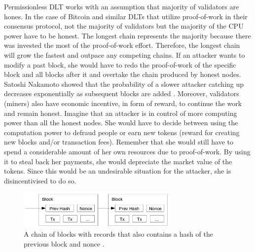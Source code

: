Permissionless DLT works with an assumption that majority of validators are hones. In the case of Bitcoin and similar DLTs that utilize proof-of-work in their consensus protocol, not the majority of validators but the majority of the CPU power have to be honest. The longest chain represents the majority because there was invested the most of the proof-of-work effort. Therefore, the longest chain will grow the fastest and outpace any competing chains. If an attacker wants to modify a past block, she would have to redo the proof-of-work of the specific block and all blocks after it and overtake the chain produced by honest nodes. Satoshi Nakamoto showed that the probability of a slower attacker catching up decreases exponentially as subsequent blocks are added \cite{nakamoto_bitcoin:_2008}. Moreover, validators (miners) also have economic incentive, in form of reward, to continue the work and remain honest. Imagine that an attacker is in control of more computing power than all the honest nodes. She would have to decide between using the computation power to defraud people or earn new tokens (reward for creating new blocks and/or transaction fees). Remember that she would still have to spend a considerable amount of her own resources due to proof-of-work. By using it to steal back her payments, she would depreciate the market value of the tokens. Since this would be an undesirable situation for the attacker, she is disincentivised to do so.

\begin{figure}[ht]
	\centering
	\includegraphics[width=0.7\textwidth]{images/blockchain-pow-satoshi.png}
	\caption{\label{fig:satoshi-blockchain-pow}A chain of blocks with records that also contains a hash of the previous block and nonce \cite{nakamoto_bitcoin:_2008}.}
\end{figure}

